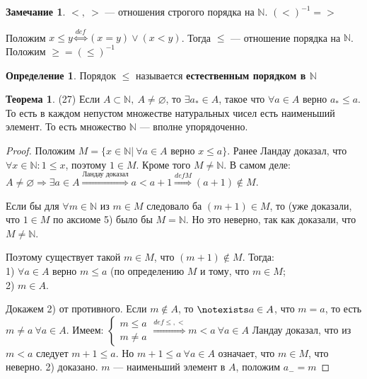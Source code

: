 \documentclass[12pt,oneside]{article}
\theoremstyle{definition}
\newtheorem{definition}{Определение}
\newtheorem{theorem}{Теорема}
\newtheorem{remark}{Замечание}
\begin{document}
\begin{remark}
$<,\ >$ --- отношения строгого порядка на $\mathbb{N}$. $(<)^{-1} = >$

Положим $x \leqslant y \stackrel{def}{\Longleftrightarrow} (x = y)\vee(x < y)$. Тогда $\leqslant$ --- отношение порядка на $\mathbb{N}$.
Положим $\geqslant = (\leqslant)^{-1}$
\end{remark}

\begin{definition}
Порядок $\leqslant$ называется \textbf{естественным порядком в $\mathbb{N}$}
\end{definition}

\begin{theorem}(27)
Если $A\subset \mathbb{N},\ A\neq\varnothing$, то $\exists a_*\in A$, такое что $\forall a\in A$ верно $a_* \leqslant a$. То есть в каждом непустом множестве натуральных чисел есть наименьший элемент. То есть множество $\mathbb{N}$ --- вполне упорядоченно. 
\begin{proof}
Положим $M = \{x\in\mathbb{N}|\ \forall a\in A \textrm{ верно } x\leqslant a\}$.
Ранее Ландау доказал, что $\forall x\in \mathbb{N}: 1 \leqslant x$, поэтому $1\in M$. Кроме того $M \neq \mathbb{N}$. В самом деле: $A\neq \varnothing \Longrightarrow \exists a\in A \stackrel{\textrm{Ландау доказал}}{\Longrightarrow} a < a + 1 \stackrel{def M}{\Longrightarrow} (a+1)\notin M$.

Если бы для $\forall m\in \mathbb{N}$ из $m\in M$ следовало ба $(m+1)\in M$, то (уже доказали, что $1\in M$ по аксиоме 5) было бы $M = \mathbb{N}$. Но это неверно, так как доказали, что $M\neq\mathbb{N}$.

Поэтому существует такой $m\in M$, что $(m+1)\notin M$. Тогда:\\
1) $\forall a\in A$ верно $m\leqslant a$ (по определению $M$ и тому, что $m\in M$;\\
2) $m\in A$.

Докажем 2) от противного. Если $m\notin A$, то $\notexists a\in A$, что $m = a$, то есть $m\neq a\ \forall a\in A$. Имеем:
$
\begin{cases}
m \leqslant a\\
m\neq a
\end{cases}\stackrel{def \leqslant,<}{\Longrightarrow} m < a\ \forall a\in A$
Ландау доказал, что из $m < a$ следует $m+1 \leqslant a$. Но $m+1\leqslant a\ \forall a\in A$ означает, что $m\in M$, что неверно. 2) доказано. $m$ --- наименьший элемент в $A$, положим $a_- = m$
\end{proof}
\end{theorem}
\end{document}
